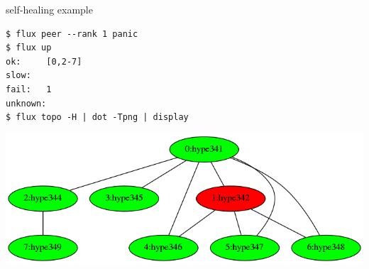 \documentclass[default,pdf,colorBG,slideColor]{prosper}
\begin{document}
\begin{slide}{self-healing example}{\tiny
\begin{verbatim}
$ flux peer --rank 1 panic
$ flux up
ok:     [0,2-7]
slow:
fail:   1
unknown:
$ flux topo -H | dot -Tpng | display
\end{verbatim}
\begin{center}
  \includegraphics[scale=1]{8tri-fail}
\end{center}
}\end{slide}
\end{document}
